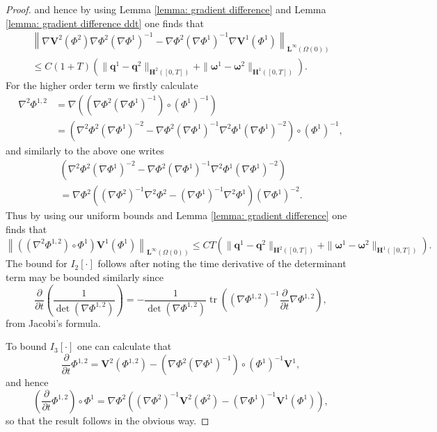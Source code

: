 \documentclass[a4paper]{amsart}
\numberwithin{equation}{section}
\newcommand{\ddt}[1]{\frac{\partial #1}{\partial t}}
\newcommand{\grad}{\nabla}
\theoremstyle{plain}
\newcommand{\mbf}[1]{\mathbf{#1}}
\newcommand{\tr}[1]{\operatorname{tr}\left(#1\right)}
\begin{document}
\begin{proof}
       and hence by using Lemma \ref{lemma: gradient difference} and Lemma \ref{lemma: gradient difference ddt} one finds that
       \begin{multline*}
       \left\| \grad \mbf{V}^2(\Phi^2) \grad \Phi^2 (\grad \Phi^1)^{-1} -  \grad \Phi^2 (\grad \Phi^1)^{-1} \grad \mbf{V}^1(\Phi^1) \right \|_{\mbf{L}^\infty(\Omega(0))}\\
        \leq C (1 + T) \left( \|\mbf{q}^1-\mbf{q}^2\|_{\mbf{H}^2([0,T])} + \|\boldsymbol{\omega}^1-\boldsymbol{\omega}^2\|_{\mbf{H}^1([0,T])} \right).
       \end{multline*}
       For the higher order term we firstly calculate
       \begin{align*}
           \grad^2 \Phi^{1,2} &= \grad \left( (\grad \Phi^2(\grad \Phi^1)^{-1}) \circ (\Phi^1)^{-1}\right)\\
           &= \left(\grad^2 \Phi^2 (\grad \Phi^1)^{-2} - \grad \Phi^2 (\grad \Phi^1)^{-1} \grad^2 \Phi^1 (\grad \Phi^1)^{-2}\right)\circ (\Phi^1)^{-1},
       \end{align*}
       and similarly to the above one writes
       \begin{multline*}
           \left(\grad^2 \Phi^2 (\grad \Phi^1)^{-2} - \grad \Phi^2 (\grad \Phi^1)^{-1} \grad^2 \Phi^1 (\grad \Phi^1)^{-2}\right)\\
           = \grad \Phi^2\left( (\grad \Phi^2)^{-1} \grad^2 \Phi^2  -  (\grad \Phi^1)^{-1} \grad^2 \Phi^1\right)(\grad \Phi^1)^{-2}.
       \end{multline*}
       Thus by using our uniform bounds and Lemma \ref{lemma: gradient difference} one finds that
       \[ \left\| ((\grad^2 \Phi^{1,2}) \circ \Phi^1) \mbf{V}^1(\Phi^1)\right\|_{\mbf{L}^\infty(\Omega(0))} \leq C T \left( \|\mbf{q}^1-\mbf{q}^2\|_{\mbf{H}^2([0,T])} + \|\boldsymbol{\omega}^1-\boldsymbol{\omega}^2\|_{\mbf{H}^1([0,T])} \right). \]
       The bound for $I_2[\cdot]$ follows after noting the time derivative of the determinant term may be bounded similarly since
       \[\ddt{} \left(\frac{1}{\det(\grad \Phi^{1,2})}\right) = -\frac{1}{\det(\grad \Phi^{1,2})} \tr{(\grad \Phi^{1,2})^{-1} \ddt{}\grad \Phi^{1,2}},\]
       from Jacobi's formula.

       To bound $I_3[\cdot]$ one can calculate that
       \[ \ddt{}\Phi^{1,2} = \mbf{V}^2(\Phi^{1,2}) - \left(\grad \Phi^2 (\grad \Phi^1)^{-1}\right) \circ (\Phi^1)^{-1} \mbf{V}^1, \]
       and hence 
       \[ \left(\ddt{}\Phi^{1,2} \right) \circ \Phi^1 = \grad \Phi^2 \left( (\grad \Phi^2)^{-1} \mbf{V}^2(\Phi^2) - (\grad \Phi^1)^{-1} \mbf{V}^1(\Phi^1)\right), \]
        so that the result follows in the obvious way.


\end{proof}
\end{document}
